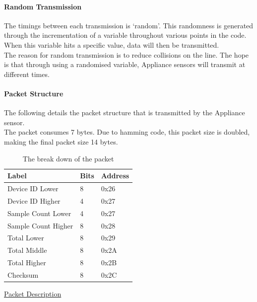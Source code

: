 \documentclass[preprint,12pt,3p]{elsarticle}
\begin{document}
\paragraph{Random Transmission}
The timings between each transmission is `random'. This randomness is generated through the incrementation of a variable throughout various points in the code. When this variable hits a specific value, data will then be transmitted. \\
The reason for random transmission is to reduce collisions on the line. The hope is that through using a randomised variable, Appliance sensors will transmit at different times.

\paragraph{Packet Structure}
The following details the packet structure that is transmitted by the Appliance sensor.\\
The packet consumes 7 bytes. Due to hamming code, this packet size is doubled, making the final packet size 14 bytes.\\[5pt]
\begin{table}[H]
\centering
\resizebox{8cm}{!} {%
    \centering
    \begin{tabular}{| l | l | p{2cm} |}
    \hline
    Label & Bits &  Address \\ \hline
    Device ID Lower & 8 & 0x26\\ \hline
    Device ID Higher & 4 & 0x27\\ \hline
    Sample Count Lower & 4 & 0x27\\ \hline
    Sample Count Higher & 8 & 0x28\\ \hline
    Total Lower & 8 & 0x29\\ \hline
    Total Middle & 8 & 0x2A\\ \hline
    Total Higher & 8 & 0x2B\\ \hline
    Checksum & 8 & 0x2C\\ \hline
    \end{tabular}
}
\caption{The break down of the packet}
\label{tab:packet}
\end{table}
\underline{Packet Description}
\end{document}

